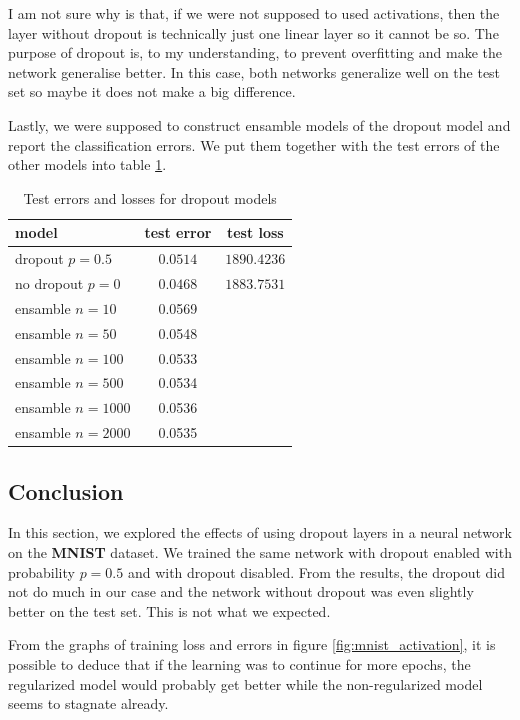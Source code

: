 \documentclass[a4paper,11pt]{article}
\begin{document}
I am not sure why is that, if we were not supposed to used activations, then the layer without dropout is technically just one linear layer so it cannot be so.
The purpose of dropout is, to my understanding, to prevent overfitting and make the network generalise better.
In this case, both networks generalize well on the test set so maybe it does not make a big difference.

Lastly, we were supposed to construct ensamble models of the dropout model and report the classification errors.
We put them together with the test errors of the other models into table \ref{tab:errors}.

\begin{table}
    \centering
    \begin{tabular}{| l | c | c |}
        \hline
        \textbf{model}    & \textbf{test error} & \textbf{test loss} \\
        \hline
        \hline
        dropout $p=0.5$   & $0.0514$            & $1890.4236$        \\
        \hline
        no dropout $p=0$  & $0.0468$            & $1883.7531$        \\
        \hline
        \hline
        ensamble $n=10$   & 0.0569              &                    \\
        ensamble $n=50$   & 0.0548              &                    \\
        ensamble $n=100$  & 0.0533              &                    \\
        ensamble $n=500$  & 0.0534              &                    \\
        ensamble $n=1000$ & 0.0536              &                    \\
        ensamble $n=2000$ & 0.0535              &                    \\
        \hline
    \end{tabular}
    \caption{Test errors and losses for dropout models}
    \label{tab:errors}
\end{table}

\subsection{Conclusion}
In this section, we explored the effects of using dropout layers in a neural network on the \textbf{MNIST} dataset.
We trained the same network with dropout enabled with probability $p=0.5$ and with dropout disabled.
From the results, the dropout did not do much in our case and the network without dropout was even slightly better on the test set.
This is not what we expected.

From the graphs of training loss and errors in figure \ref{fig:mnist_activation}, it is possible to deduce that if the learning was to continue for more epochs, the regularized model would probably get better while the non-regularized model seems to stagnate already.
\end{document}
